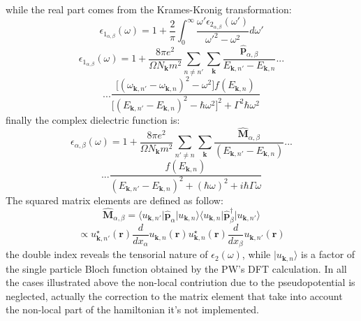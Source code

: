 \documentclass[twocolumn]{article}
\begin{document}
while the real part comes from the Krames-Kronig transformation:
\begin{equation}
\epsilon_{1_{\alpha,\beta}}(\omega)=1+\frac{2}{\pi}\int_{0}^{\infty}\frac{\omega' \epsilon_{2_{\alpha,\beta}}(\omega')}
{\omega'^{2}-\omega^{2}}d\omega'
\end{equation}
\begin{displaymath}
\epsilon_{1_{\alpha,\beta}}(\omega)=1+\frac{8 \pi e^2}{\Omega N_{\textbf{k}} m^2}\sum_{n\ne n'}\sum_{\textbf{k}}
\frac{\hat{\textbf{p}}_{\alpha,\beta}}{E_{\textbf{k},n'}-E_{\textbf{k},n}}...
\end{displaymath}
\begin{equation}
...\frac{\big[(\omega_{\textbf{k},n'}-\omega_{\textbf{k},n})^2-\omega^2\big]f(E_{\textbf{k},n})}{\big[(E_{\textbf{k},n'}-E_{\textbf{k},n})^2
-\hbar\omega^2\big]^2+\Gamma^2\hbar\omega^2}
\end{equation}
finally the complex dielectric function is:
\begin{displaymath}
\epsilon_{\alpha,\beta}(\omega)=1+\frac{8 \pi e^2}{\Omega N_{\textbf{k}} m^2}\sum_{n'\ne n}\sum_{\textbf{k}}
\frac{\hat{\textbf{M}}_{\alpha,\beta}}{(E_{\textbf{k},n'}-E_{\textbf{k},n})}...
\end{displaymath}
\begin{displaymath}
...\frac{f(E_{\textbf{k},n})}{(E_{\textbf{k},n'}-E_{\textbf{k},n})^2+(\hbar\omega)^2+i\hbar\Gamma\omega}
\end{displaymath}
The squared matrix elements are defined as follow:
\begin{equation}
\hat{\textbf{M}}_{\alpha,\beta}=\langle u_{\textbf{k},n'}\vert\hat{\textbf{p}}_{\alpha}\vert u_{\textbf{k},n}\rangle
\langle u_{\textbf{k},n}\vert\hat{\textbf{p}}_{\beta}^{\dagger}\vert u_{\textbf{k},n'}\rangle
\label{nos}
\end{equation}
\begin{equation}
\propto u_{\textbf{k},n'}^{\star}(\textbf{r})\frac{d}{d x_{\alpha}}u_{\textbf{k},n}(\textbf{r})
u_{\textbf{k},n}^{\star}(\textbf{r})\frac{d}{d x_{\beta}}u_{\textbf{k},n'}(\textbf{r})
\end{equation}
the double index reveals the tensorial nature of $\epsilon_{2}(\omega)$, while $\vert u_{\textbf{k},n}\rangle$ is a
factor of the single particle Bloch function obtained by the PW's DFT calculation.
In all the cases illustrated above the non-local contriution due to the pseudopotential is neglected, actually the
correction to the matrix element that take into account the non-local part of the hamiltonian it's not implemented.
\end{document}
